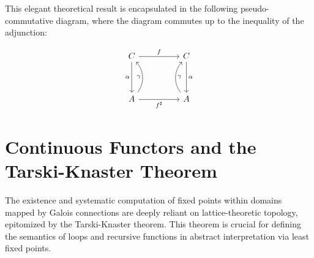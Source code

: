 This elegant theoretical result is encapsulated in the following pseudo-commutative diagram, where the diagram commutes up to the inequality of the adjunction:

\[\begin{tikzcd}[row sep=huge, column sep=huge]
C \arrow[r, "f"] \arrow[d, "\alpha"'] & C \arrow[d, "\alpha"] \\
A \arrow[r, "f^\sharp"'] \arrow[u, "\gamma", bend right=40] & A \arrow[u, "\gamma"', bend right=-40]
\end{tikzcd}\]

\section{Continuous Functors and the Tarski-Knaster Theorem}

The existence and systematic computation of fixed points within domains mapped by Galois connections are deeply reliant on lattice-theoretic topology, epitomized by the Tarski-Knaster theorem. This theorem is crucial for defining the semantics of loops and recursive functions in abstract interpretation via least fixed points.

